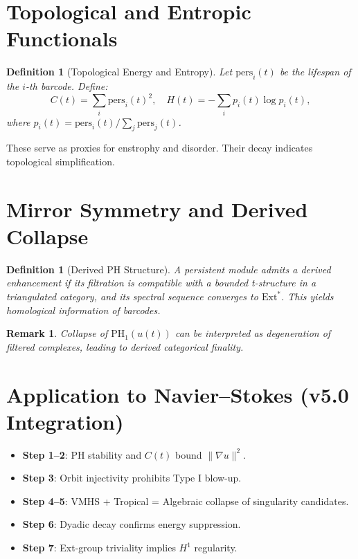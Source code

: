 \documentclass[11pt]{article}
\newtheorem{definition}[theorem]{Definition}
\newtheorem{remark}[theorem]{Remark}
\begin{document}
\section{Topological and Entropic Functionals}

\begin{definition}[Topological Energy and Entropy]
Let $\mathrm{pers}_i(t)$ be the lifespan of the $i$-th barcode. Define:
\[
C(t) = \sum_i \mathrm{pers}_i(t)^2, \quad H(t) = -\sum_i p_i(t) \log p_i(t),
\]
where $p_i(t) = \mathrm{pers}_i(t)/\sum_j \mathrm{pers}_j(t)$.
\end{definition}

These serve as proxies for enstrophy and disorder. Their decay indicates topological simplification.

\section{Mirror Symmetry and Derived Collapse}

\begin{definition}[Derived PH Structure]
A persistent module admits a \emph{derived enhancement} if its filtration is compatible with a bounded t-structure in a triangulated category, and its spectral sequence converges to $\mathrm{Ext}^*$. This yields homological information of barcodes.
\end{definition}

\begin{remark}
Collapse of $\mathrm{PH}_1(u(t))$ can be interpreted as degeneration of filtered complexes, leading to derived categorical finality.
\end{remark}

\section{Application to Navier--Stokes (v5.0 Integration)}

\begin{itemize}
    \item \textbf{Step 1--2}: PH stability and $C(t)$ bound $\|\nabla u\|^2$.
    \item \textbf{Step 3}: Orbit injectivity prohibits Type I blow-up.
    \item \textbf{Step 4--5}: VMHS + Tropical = Algebraic collapse of singularity candidates.
    \item \textbf{Step 6}: Dyadic decay confirms energy suppression.
    \item \textbf{Step 7}: Ext-group triviality implies $H^1$ regularity.
\end{itemize}
\end{document}
